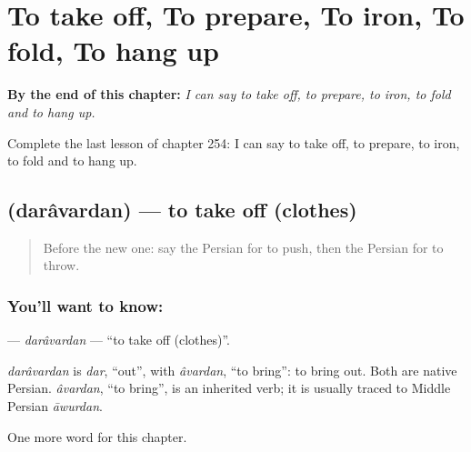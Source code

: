 
\chapter{To take off, To prepare, To iron, To fold, To hang up}
\label{ch:fa-to-take-off-to-prepare-to-iron-to-fold-to-hang-up}

\begin{chapteropening}
\textbf{By the end of this chapter:} \emph{I can say to take off, to prepare, to iron, to fold and to hang up.}

Complete the last lesson of chapter 254: I can say to take off, to prepare, to iron, to fold and to hang up.
\end{chapteropening}

\section[\texorpdfstring{\fa{درآوردن} (darâvardan)}{درآوردن (darâvardan)}]{ (darâvardan) — to take off (clothes)}

\label{lesson:FA-C254-daravardan}



\begin{quote}
Before the new one: say the Persian for to push, then the Persian for to throw.
\end{quote}

\subsection*{You'll want to know: }
\textbf{} — \emph{darâvardan} — \textquotedblleft{}to take off (clothes)\textquotedblright{}.

\begin{cousinweb}
\emph{darâvardan} is \emph{dar}, \textquotedblleft{}out\textquotedblright{}, with \emph{âvardan}, \textquotedblleft{}to bring\textquotedblright{}: to bring out. Both are native Persian. \emph{âvardan}, \textquotedblleft{}to bring\textquotedblright{}, is an inherited verb; it is usually traced to Middle Persian \emph{āwurdan}.
\end{cousinweb}

\begin{grammarlens}[title={What you've built}]
One more word for this chapter.
\end{grammarlens}

